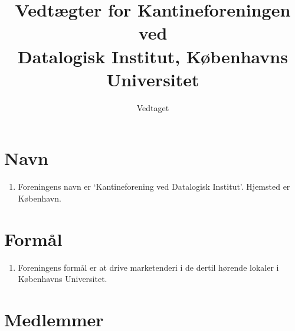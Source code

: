 \documentclass[a4paper, 10pt]{article}
\title{Vedtægter for Kantineforeningen ved \\ Datalogisk Institut,
Københavns Universitet}
\author{}
\date{Vedtaget \vedtagsdato{}}
\renewcommand\thesection{\textsection\arabic{section}}
\newenvironment{stykenum}{
  \begin{enumerate}[%
    label=Stk.~\arabic*., ref=\thesection~Stk.~\arabic*, start=1]
}{\end{enumerate}}
\begin{document}
\maketitle
\thispagestyle{first}

\section{Navn}

\begin{stykenum}
\item
\label{navn} Foreningens navn er `Kantineforening ved Datalogisk Institut'.
Hjemsted er København.
\end{stykenum}

\section{Formål}

\begin{stykenum}
    \item
    \label{formaal} Foreningens formål er at drive marketenderi i de
    dertil hørende lokaler i Kø\-benhavns Universitet.
\end{stykenum}

\section{Medlemmer}
\end{document}
